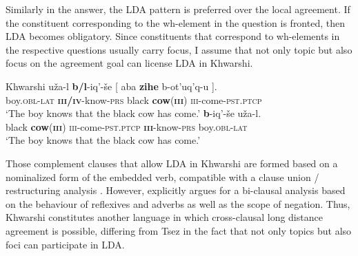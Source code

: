 \documentclass[output=paper
,modfonts
,nonflat]{langsci/langscibook}
\begin{document}
Similarly in the answer, the LDA pattern is preferred over the local agreement. If the constituent corresponding to the wh-element in the question is fronted, then LDA becomes obligatory. Since constituents that correspond to wh-elements in the respective questions usually carry focus, I assume that not only topic but also focus on the agreement goal can license LDA in Khwarshi.
\begin{exe}
\ex Khwarshi  \citep[][390]{Khalilova2008}
	\xlist
	\ex
		\gll u\v{z}a-l \textbf{b/l}-iq'-\v{s}e [ aba \textbf{zihe} b-ot'uq'q-u ].\\
			 boy.\textsc{obl-lat} \textbf{\textsc{iii/iv}}-know-\textsc{prs} {} black \textbf{cow}(\textbf{\textsc{iii}}) \textsc{iii}-come-\textsc{pst.ptcp} {}\\
		\glt `The boy knows that the black cow has come.'
	\ex
		 \textbf{b}-iq'-\v{s}e u\v{z}a-l.\\
			 {} black \textbf{cow}(\textbf{\textsc{iii}}) \textsc{iii}-come-\textsc{pst.ptcp} {} \textbf{\textsc{iii}}-know-\textsc{prs} boy.\textsc{obl-lat}\\
		\glt `The boy knows that the black cow has come.'	
	\endxlist
\end{exe}
Those complement clauses that allow LDA in Khwarshi are formed based on a nominalized form of the embedded verb, compatible with a clause union / restructuring analysis \citep[][for Godoberi]{Haspelmath1999}. However, \citet[386-388]{Khalilova2009} explicitly argues for a bi-clausal analysis based on the behaviour of reflexives and adverbs as well as the scope of negation. Thus, Khwarshi constitutes another language in which cross-clausal long distance agreement is possible, differing from Tsez in the fact that not only topics but also foci can participate in LDA.
\end{document}
